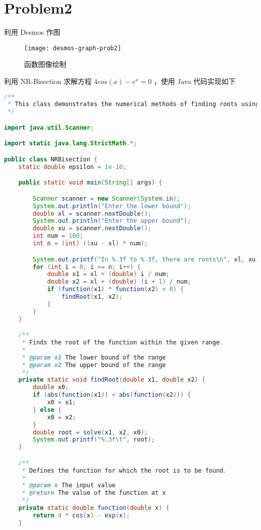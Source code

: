 \documentclass[UTF8]{ctexart}
\begin{document}
    \newpage
    \section{Problem2}\label{sec:problem2}
    利用 Desmos 作图
    \begin{figure}[h]
        \centering
        \texttt{[image: desmos-graph-prob2]}
        \caption{函数图像绘制}\label{fig:figure2.1}
    \end{figure}
    利用 NR-Bisection 求解方程 \(4cos(x) - e^x = 0\) ，使用 Java 代码实现如下
    \begin{lstlisting}[language=Java, breaklines = true,label={lst:lstlisting2}]
/**
 * This class demonstrates the numerical methods of finding roots using a combination of NR and Bisection methods.
 */

import java.util.Scanner;

import static java.lang.StrictMath.*;

public class NRBisection {
    static double epsilon = 1e-10;

    public static void main(String[] args) {

        Scanner scanner = new Scanner(System.in);
        System.out.println("Enter the lower bound");
        double xl = scanner.nextDouble();
        System.out.println("Enter the upper bound");
        double xu = scanner.nextDouble();
        int num = 100;
        int n = (int) ((xu - xl) * num);

        System.out.printf("In %.3f to %.3f, there are roots\n", xl, xu);
        for (int i = 0; i <= n; i++) {
            double x1 = xl + (double) i / num;
            double x2 = xl + (double) (i + 1) / num;
            if (function(x1) * function(x2) < 0) {
                findRoot(x1, x2);
            }
        }
    }

    /**
     * Finds the root of the function within the given range.
     *
     * @param x1 The lower bound of the range
     * @param x2 The upper bound of the range
     */
    private static void findRoot(double x1, double x2) {
        double x0;
        if (abs(function(x1)) < abs(function(x2))) {
            x0 = x1;
        } else {
            x0 = x2;
        }
        double root = solve(x1, x2, x0);
        System.out.printf("%.3f\t", root);
    }

    /**
     * Defines the function for which the root is to be found.
     *
     * @param x The input value
     * @return The value of the function at x
     */
    private static double function(double x) {
        return 4 * cos(x) - exp(x);
    }


\end{lstlisting}
\end{document}
